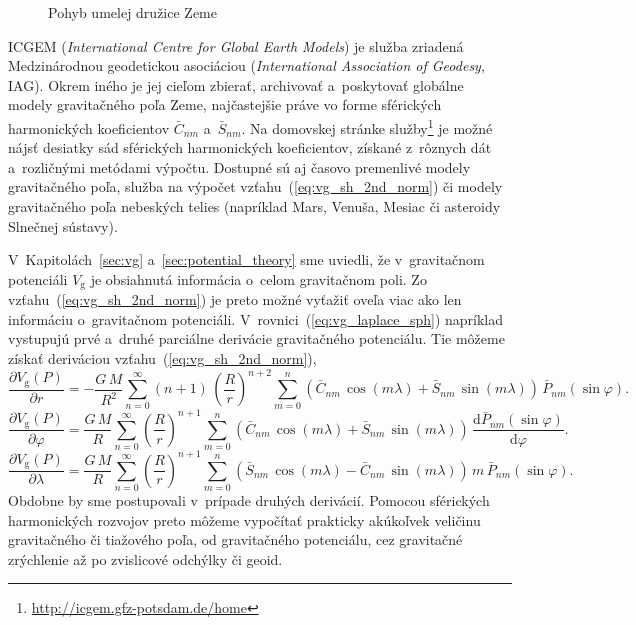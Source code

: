\documentclass[a4paper, 12pt]{book}
\newcommand{\diff}{\mathrm d}
\newcommand{\gidx}{\mathrm g}
\begin{document}
\begin{figure}
\centering

\caption{Pohyb umelej družice Zeme}
\label{fig:orbital_motion_real}
\end{figure}

ICGEM (\emph{International Centre for Global Earth Models}) je služba zriadená 
Medzinárodnou geodetickou asociáciou (\emph{International Association of 
Geodesy}, IAG).  Okrem iného je jej cieľom zbierať, archivovať a~poskytovať 
globálne modely gravitačného poľa Zeme, najčastejšie práve vo forme sférických 
harmonických koeficientov $\bar{C}_{nm}$ a~$\bar{S}_{nm}$.  Na domovskej 
stránke služby\footnote{\url{http://icgem.gfz-potsdam.de/home}} je možné nájsť 
desiatky sád sférických harmonických koeficientov, získané z~rôznych dát 
a~rozličnými metódami výpočtu.  Dostupné sú aj časovo premenlivé modely 
gravitačného poľa, služba na výpočet vzťahu~(\ref{eq:vg_sh_2nd_norm}) či modely 
gravitačného poľa nebeských telies (napríklad Mars, Venuša, Mesiac či asteroidy 
Slnečnej sústavy).

V~Kapitolách~\ref{sec:vg} a~\ref{sec:potential_theory} sme uviedli, že 
v~gravitačnom potenciáli $V_\gidx$ je obsiahnutá informácia o~celom gravitačnom 
poli.  Zo vzťahu~(\ref{eq:vg_sh_2nd_norm}) je preto možné vyťažiť oveľa viac 
ako len informáciu o~gravitačnom potenciáli.  
V~rovnici~(\ref{eq:vg_laplace_sph}) napríklad vystupujú prvé a~druhé parciálne 
derivácie gravitačného potenciálu.  Tie môžeme získať deriváciou 
vzťahu~(\ref{eq:vg_sh_2nd_norm}),
%
\begin{equation}
\label{eq:vgr_sh_2nd_norm}
\frac{\partial V_\gidx(P)}{\partial r} = - \frac{G \, M}{R^2} \sum_{n 
= 0}^\infty (n + 1) \, \left( \frac{R}{r} \right)^{n + 2} \sum_{m = 0}^{n} 
\left( \bar{C}_{nm} \, \cos(m\lambda) + \bar{S}_{nm} \, \sin(m\lambda)\right) 
\, \bar{P}_{nm}(\sin\varphi){.}
\end{equation}
%
\begin{equation}
\label{eq:vglat_sh_2nd_norm}
\frac{\partial V_\gidx(P)}{\partial \varphi} = \frac{G \, M}{R} \sum_{n 
= 0}^\infty \left( \frac{R}{r} \right)^{n + 1} \sum_{m = 0}^{n} \left( 
\bar{C}_{nm} \, \cos(m\lambda) + \bar{S}_{nm} \, \sin(m\lambda)\right) \, 
\frac{\diff \bar{P}_{nm}(\sin\varphi)}{\diff \varphi}{.}
\end{equation}
%
\begin{equation}
\label{eq:vglon_sh_2nd_norm}
\frac{\partial V_\gidx(P)}{\partial \lambda} = \frac{G \, M}{R} \sum_{n 
= 0}^\infty \left( \frac{R}{r} \right)^{n + 1} \sum_{m = 0}^{n}\left( 
\bar{S}_{nm} \, \cos(m\lambda) - \bar{C}_{nm} \, \sin(m\lambda)\right) \, m \, 
\bar{P}_{nm}(\sin\varphi){.}
\end{equation}
%
Obdobne by sme postupovali v~prípade druhých derivácií.  Pomocou sférických 
harmonických rozvojov preto môžeme vypočítať prakticky akúkoľvek veličinu 
gravitačného či tiažového poľa, od gravitačného potenciálu, cez gravitačné 
zrýchlenie až po zvislicové odchýlky či geoid.
\end{document}
